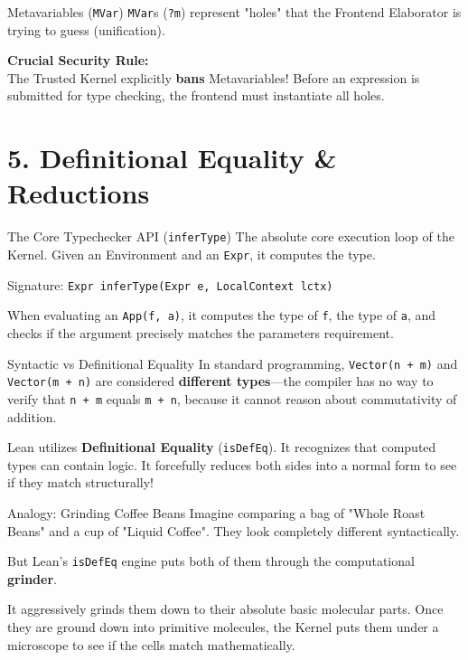 \documentclass[10pt,aspectratio=169]{beamer}
\begin{document}
\begin{frame}[fragile]{Metavariables (\texttt{MVar})}
    \verb|MVar|s (\verb|?m|) represent "holes" that the Frontend Elaborator is trying to guess (unification).
    
    \vspace{1em}
    \textbf{Crucial Security Rule:} \\
    The Trusted Kernel explicitly \textbf{bans} Metavariables! Before an expression is submitted for type checking, the frontend must instantiate all holes.
\end{frame}

\section{5. Definitional Equality \& Reductions}

\begin{frame}[fragile]{The Core Typechecker API (\texttt{inferType})}
    The absolute core execution loop of the Kernel. Given an Environment and an \verb|Expr|, it computes the type.
    
    \vspace{1em}
    Signature: \verb|Expr inferType(Expr e, LocalContext lctx)|
    
    When evaluating an \verb|App(f, a)|, it computes the type of \verb|f|, the type of \verb|a|, and checks if the argument precisely matches the parameters requirement.
\end{frame}

\begin{frame}[fragile]{Syntactic vs Definitional Equality}
    In standard programming, \verb|Vector(n + m)| and \verb|Vector(m + n)| are considered \textbf{different types}—the compiler has no way to verify that \verb|n + m| equals \verb|m + n|, because it cannot reason about commutativity of addition.
    
    Lean utilizes \textbf{Definitional Equality} (\verb|isDefEq|). It recognizes that computed types can contain logic. It forcefully reduces both sides into a normal form to see if they match structurally!
\end{frame}

\begin{frame}[fragile]{Analogy: Grinding Coffee Beans}
    Imagine comparing a bag of "Whole Roast Beans" and a cup of "Liquid Coffee". They look completely different syntactically.
    
    \vspace{1em}
    But Lean's \verb|isDefEq| engine puts both of them through the computational \textbf{grinder}. 
    
    \vspace{1em}
    It aggressively grinds them down to their absolute basic molecular parts. Once they are ground down into primitive molecules, the Kernel puts them under a microscope to see if the cells match mathematically.
\end{frame}
\end{document}
